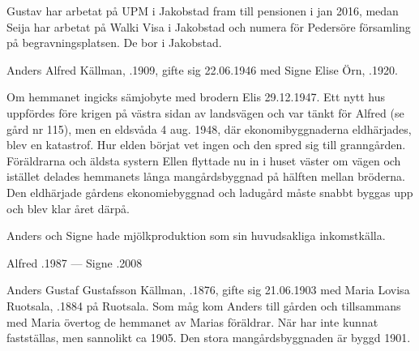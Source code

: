 Gustav har arbetat på UPM i Jakobstad fram till pensionen i jan 2016, medan Seija har arbetat på Walki Visa i Jakobstad och numera för Pedersöre församling på begravningsplatsen. De bor i Jakobstad.
\begin{jhchildren}
  \item {}
  \item {}
\end{jhchildren}


Anders Alfred Källman, .1909, gifte sig 22.06.1946 med Signe Elise Örn, .1920.

Om hemmanet ingicks sämjobyte med brodern Elis 29.12.1947. Ett nytt hus uppfördes före krigen på västra sidan av landsvägen och var tänkt för Alfred (se gård nr 115), men en eldsvåda 4 aug. 1948, där ekonomibyggnaderna eldhärjades, blev en katastrof. Hur elden börjat vet ingen och den spred sig till granngården. Föräldrarna och äldsta systern Ellen flyttade nu in i huset väster om vägen och istället delades hemmanets långa mangårdsbyggnad på hälften mellan bröderna. Den eldhärjade gårdens ekonomiebyggnad och ladugård måste snabbt byggas upp och blev klar året därpå.

Anders och Signe hade mjölkproduktion som sin huvudsakliga inkomstkälla.
\begin{jhchildren}
  \item {}
  \item {}
\end{jhchildren}

Alfred .1987  ---  Signe .2008


Anders Gustaf Gustafsson Källman, .1876, gifte sig 21.06.1903 med Maria Lovisa Ruotsala, .1884 på Ruotsala. Som måg kom Anders till gården och tillsammans med Maria övertog de hemmanet av Marias föräldrar. När har inte kunnat fastställas, men sannolikt ca 1905. Den stora mangårdsbyggnaden är byggd 1901.
\begin{jhchildren}
  \item {}
  \item {}
  \item {}
  \item {}
  \item {}
  \item {}
  \item {}
\end{jhchildren}

